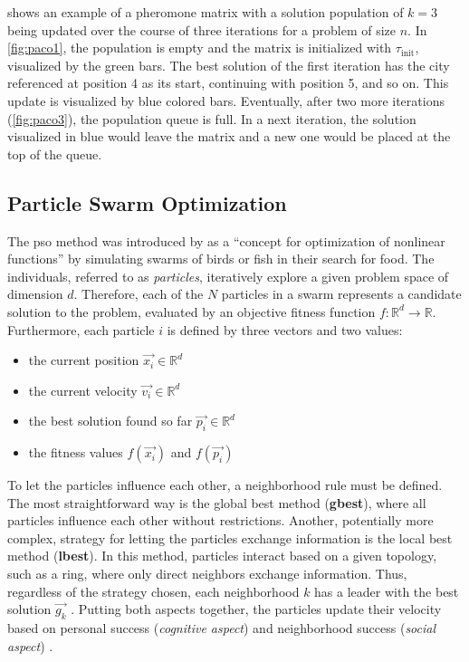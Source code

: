  shows an example of a pheromone matrix with a solution population of $k=3$ being updated over the course of three iterations for a problem of size $n$. In \cref{fig:paco1}, the population is empty and the matrix is initialized with $\tau_{\text{init}}$, visualized by the green bars. The best solution of the first iteration has the city referenced at position 4 as its start, continuing with position 5, and so on. This update is visualized by blue colored bars. Eventually, after two more iterations (\cref{fig:paco3}), the population queue is full. In a next iteration, the solution visualized in blue would leave the matrix and a new one would be placed at the top of the queue.

\subsection{Particle Swarm Optimization}

The \gls{pso} method was introduced by \citet{kennedy1995particle} as a \enquote{concept for optimization of nonlinear functions} by simulating swarms of birds or fish in their search for food. The individuals, referred to as \textit{particles}, iteratively explore a given problem space of dimension $d$. Therefore, each of the $N$ particles in a swarm represents a candidate solution to the problem, evaluated by an objective fitness function $f: \mathbb{R}^d \to \mathbb{R}$. Furthermore, each particle $i$ is defined by three vectors and two values:
\begin{itemize}
	\item the current position $\vec{x_i} \in \mathbb{R}^d$ 
	\item the current velocity $\vec{v_i} \in \mathbb{R}^d$ 
	\item the best solution found so far $\vec{p_i} \in \mathbb{R}^d$
	\item the fitness values $f(\vec{x_i})$ and $f(\vec{p_i})$
\end{itemize}

To let the particles influence each other, a neighborhood rule must be defined. The most straightforward way is the global best method (\textbf{gbest}), where all particles influence each other without restrictions. Another, potentially more complex, strategy for letting the particles exchange information is the local best method (\textbf{lbest}). In this method, particles interact based on a given topology, such as a ring, where only direct neighbors exchange information. Thus, regardless of the strategy chosen, each neighborhood $k$ has a leader with the best solution $\vec{g_k}$ \cite{talbi2009metaheuristics}. Putting both aspects together, the particles update their velocity based on personal success (\textit{cognitive aspect}) and neighborhood success (\textit{social aspect}) \cite{janson2003hierarchical}. 

